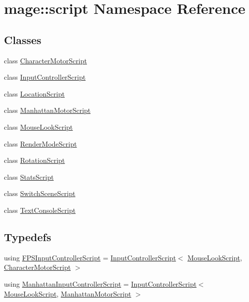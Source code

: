 \hypertarget{namespacemage_1_1script}{}\section{mage\+:\+:script Namespace Reference}
\label{namespacemage_1_1script}
\subsection*{Classes}
\begin{DoxyCompactItemize}
\item 
class \hyperlink{classmage_1_1script_1_1_character_motor_script}{Character\+Motor\+Script}
\item 
class \hyperlink{classmage_1_1script_1_1_input_controller_script}{Input\+Controller\+Script}
\item 
class \hyperlink{classmage_1_1script_1_1_location_script}{Location\+Script}
\item 
class \hyperlink{classmage_1_1script_1_1_manhattan_motor_script}{Manhattan\+Motor\+Script}
\item 
class \hyperlink{classmage_1_1script_1_1_mouse_look_script}{Mouse\+Look\+Script}
\item 
class \hyperlink{classmage_1_1script_1_1_render_mode_script}{Render\+Mode\+Script}
\item 
class \hyperlink{classmage_1_1script_1_1_rotation_script}{Rotation\+Script}
\item 
class \hyperlink{classmage_1_1script_1_1_stats_script}{Stats\+Script}
\item 
class \hyperlink{classmage_1_1script_1_1_switch_scene_script}{Switch\+Scene\+Script}
\item 
class \hyperlink{classmage_1_1script_1_1_text_console_script}{Text\+Console\+Script}
\end{DoxyCompactItemize}
\subsection*{Typedefs}
\begin{DoxyCompactItemize}
\item 
using \hyperlink{namespacemage_1_1script_a851bfe5cd371dbeec9d1b629ed52ab61}{F\+P\+S\+Input\+Controller\+Script} = \hyperlink{classmage_1_1script_1_1_input_controller_script}{Input\+Controller\+Script}$<$ \hyperlink{classmage_1_1script_1_1_mouse_look_script}{Mouse\+Look\+Script}, \hyperlink{classmage_1_1script_1_1_character_motor_script}{Character\+Motor\+Script} $>$
\item 
using \hyperlink{namespacemage_1_1script_ae399ac9a69c775626d6080400f8716e9}{Manhattan\+Input\+Controller\+Script} = \hyperlink{classmage_1_1script_1_1_input_controller_script}{Input\+Controller\+Script}$<$ \hyperlink{classmage_1_1script_1_1_mouse_look_script}{Mouse\+Look\+Script}, \hyperlink{classmage_1_1script_1_1_manhattan_motor_script}{Manhattan\+Motor\+Script} $>$
\end{DoxyCompactItemize}



